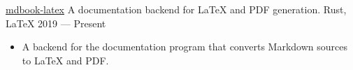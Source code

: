 \showoff
{\textcolor{my-blue}{\href{https://liambeckman.com/mdbook-latex}{mdbook-latex}}}
{A documentation backend for \LaTeX{} and PDF generation.}
{Rust, \LaTeX{}}
{2019 --- Present}

\begin{itemize}[label=$\triangleright$]
    \item A backend for the  documentation program that converts Markdown sources to \LaTeX{} and PDF.
\end{itemize}

